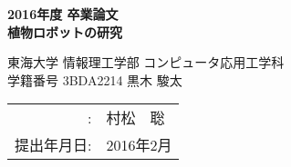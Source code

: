 
%
%

%

\begin{titlepage}
\vspace*{2cm}
\begin{center}
{\Large\bf 2016年度 卒業論文}\\
\vspace{1cm}
{\LARGE\bf 植物ロボットの研究}

\vspace{3cm}
{\Large 
東海大学 情報理工学部 コンピュータ応用工学科}\\

\vspace{1cm}
{\large 学籍番号 3BDA2214 \hspace{5mm} 黒木 駿太}\\


\vspace{1cm}
\begin{tabular}{rl}
\hspace{15mm}{\large 指導教員}
		:& {\large 村松　聡}
\\
\hspace{9mm}提出年月日:& 2016年2月\\
\end{tabular}
\end{center}
\end{titlepage}

\normalsize
\pagestyle{plain}

\tableofcontents
\listoffigures
\listoftables












